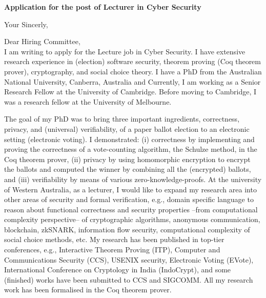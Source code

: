 \documentclass[11pt,a4paper,roman]{moderncv}
\begin{document}
\date{}
\opening{\textbf{Application for the post of Lecturer in Cyber Security}}

\closing{Your Sincerly, \vspace{-1em}}



\makelettertitle



Dear Hiring Committee, 
\\
\vspace{1em}
I am writing to apply for the Lecture job in Cyber Security.
I have extensive research experience in
(election) software security, theorem proving (Coq theorem prover), cryptography,  
and social choice theory. 
I have a PhD from the Australian National University, Canberra, Australia
and Currently, I am working as a Senior Research Fellow at the University of 
Cambridge. Before moving to Cambridge, I was a 
research fellow at the University of Melbourne. 


The goal of my PhD was to 
bring  three important ingredients, correctness, privacy, and (universal) verifiability, of a 
paper ballot election to an electronic setting (electronic voting). I 
demonstrated: (i) correctness by implementing and proving the correctness of 
a vote-counting algorithm, the Schulze method, in the Coq theorem prover, 
(ii) privacy by using homomorphic encryption to encrypt the ballots and computed
the winner by combining all the (encrypted) ballots, and 
(iii) verifiability by means of various zero-knowledge-proofs.
At the university of Western Australia, as a lecturer, 
I would like to expand my research area into other areas of 
security and formal verification, e.g., domain specific language to reason about 
functional correctness and security properties --from computational complexity perspective-- of 
cryptographic algorithms, anonymous communication, blockchain, zkSNARK,  
information flow security, computational complexity of social choice methods, 
etc. My research has been published in top-tier conferences, e.g., Interactive Theorem Proving (ITP), 
Computer and Communications Security (CCS), USENIX security, Electronic Voting (EVote), 
International Conference on Cryptology in India (IndoCrypt),
and some (finished) works have been submitted to CCS and SIGCOMM. 
All my research work has been formalised in the Coq theorem prover. 
\end{document}
